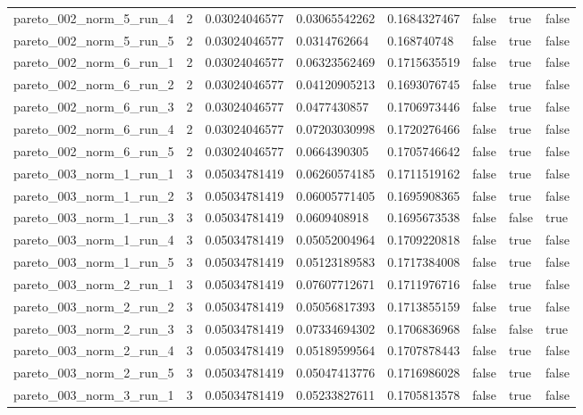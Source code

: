 \begin{tabular}{@{}llllllll@{}}
pareto\_002\_norm\_5\_run\_4 & 2 & 0.03024046577 & 0.03065542262 & 0.1684327467 & false & true & false \\
pareto\_002\_norm\_5\_run\_5 & 2 & 0.03024046577 & 0.0314762664 & 0.168740748 & false & true & false \\
pareto\_002\_norm\_6\_run\_1 & 2 & 0.03024046577 & 0.06323562469 & 0.1715635519 & false & true & false \\
pareto\_002\_norm\_6\_run\_2 & 2 & 0.03024046577 & 0.04120905213 & 0.1693076745 & false & true & false \\
pareto\_002\_norm\_6\_run\_3 & 2 & 0.03024046577 & 0.0477430857 & 0.1706973446 & false & true & false \\
pareto\_002\_norm\_6\_run\_4 & 2 & 0.03024046577 & 0.07203030998 & 0.1720276466 & false & true & false \\
pareto\_002\_norm\_6\_run\_5 & 2 & 0.03024046577 & 0.0664390305 & 0.1705746642 & false & true & false \\
pareto\_003\_norm\_1\_run\_1 & 3 & 0.05034781419 & 0.06260574185 & 0.1711519162 & false & true & false \\
pareto\_003\_norm\_1\_run\_2 & 3 & 0.05034781419 & 0.06005771405 & 0.1695908365 & false & true & false \\
pareto\_003\_norm\_1\_run\_3 & 3 & 0.05034781419 & 0.0609408918 & 0.1695673538 & false & false & true \\
pareto\_003\_norm\_1\_run\_4 & 3 & 0.05034781419 & 0.05052004964 & 0.1709220818 & false & true & false \\
pareto\_003\_norm\_1\_run\_5 & 3 & 0.05034781419 & 0.05123189583 & 0.1717384008 & false & true & false \\
pareto\_003\_norm\_2\_run\_1 & 3 & 0.05034781419 & 0.07607712671 & 0.1711976716 & false & true & false \\
pareto\_003\_norm\_2\_run\_2 & 3 & 0.05034781419 & 0.05056817393 & 0.1713855159 & false & true & false \\
pareto\_003\_norm\_2\_run\_3 & 3 & 0.05034781419 & 0.07334694302 & 0.1706836968 & false & false & true \\
pareto\_003\_norm\_2\_run\_4 & 3 & 0.05034781419 & 0.05189599564 & 0.1707878443 & false & true & false \\
pareto\_003\_norm\_2\_run\_5 & 3 & 0.05034781419 & 0.05047413776 & 0.1716986028 & false & true & false \\
pareto\_003\_norm\_3\_run\_1 & 3 & 0.05034781419 & 0.05233827611 & 0.1705813578 & false & true & false \\

\end{tabular}

